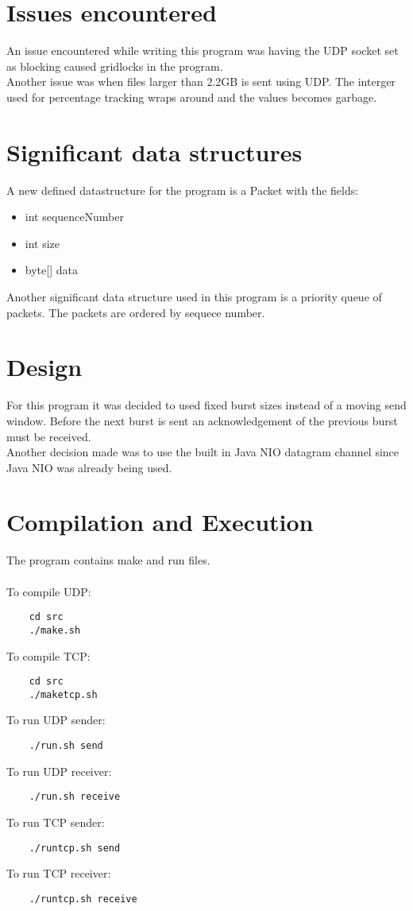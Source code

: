 \documentclass[a4paper,10pt]{article}
\begin{document}
\section{Issues encountered}
An issue encountered while writing this program was having the UDP socket set
as blocking caused gridlocks in the program.\\
Another issue was when files larger than 2.2GB is sent using UDP. The interger
used for percentage tracking wraps around and the values becomes garbage.

\section{Significant data structures}
A new defined datastructure for the program is a Packet with the fields:
\begin{itemize}
	\item int sequenceNumber
	\item int size
	\item byte[] data
\end{itemize}
Another significant data structure used in this program is a priority queue of
packets. The packets are ordered by sequece number.

\section{Design}
For this program it was decided to used fixed burst sizes instead of a moving
send window. Before the next burst is sent an acknowledgement of the previous
burst must be received.\\
Another decision made was to use the built in Java NIO datagram channel since
Java NIO was already being used.

\section{Compilation and Execution}
The program contains make and run files.\\\\
To compile UDP:
\begin{verbatim}
	cd src
	./make.sh
\end{verbatim}
To compile TCP:
\begin{verbatim}
	cd src
	./maketcp.sh
\end{verbatim}
To run UDP sender:
\begin{verbatim}
	./run.sh send
\end{verbatim}
To run UDP receiver:
\begin{verbatim}
	./run.sh receive
\end{verbatim}
To run TCP sender:
\begin{verbatim}
	./runtcp.sh send
\end{verbatim}
To run TCP receiver:
\begin{verbatim}
	./runtcp.sh receive
\end{verbatim}
\end{document}
